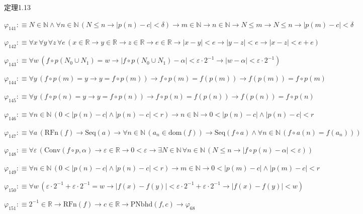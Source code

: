 \begin{fullproof}{定理1.13}
\begin{abbrevlist}
\item $\varphi_{141} :\equiv N \in \mathbb{N} \land \forall n \in \mathbb{N}\,(N \leq n \to \lvert p(n) - c \rvert < \delta) \to m \in \mathbb{N} \to n \in \mathbb{N} \to N \leq m \to N \leq n \to \lvert p(m) - c \rvert < \delta$
\item $\varphi_{142} :\equiv \forall x\,\forall y\,\forall z\,\forall e\,(x \in \mathbb{R} \to y \in \mathbb{R} \to z \in \mathbb{R} \to e \in \mathbb{R} \to \lvert x - y \rvert < e \to \lvert y - z \rvert < e \to \lvert x - z \rvert < e + e)$
\item $\varphi_{143} :\equiv \forall w\,(f \circ p(N_{0} \cup N_{1}) = w \to \lvert f \circ p(N_{0} \cup N_{1}) - \alpha \rvert < \varepsilon \cdot 2^{-1} \to \lvert w - \alpha \rvert < \varepsilon \cdot 2^{-1})$
\item $\varphi_{144} :\equiv \forall y\,(f \circ p(m) = y \to y = f \circ p(m)) \to f \circ p(m) = f(p(m)) \to f(p(m)) = f \circ p(m)$
\item $\varphi_{145} :\equiv \forall y\,(f \circ p(n) = y \to y = f \circ p(n)) \to f \circ p(n) = f(p(n)) \to f(p(n)) = f \circ p(n)$
\item $\varphi_{146} :\equiv \forall n \in \mathbb{N}\,(0 < \lvert p(n) - c \rvert \land \lvert p(n) - c \rvert < r) \to n \in \mathbb{N} \to 0 < \lvert p(n) - c \rvert \land \lvert p(n) - c \rvert < r$
\item $\varphi_{147} :\equiv \forall a\,(\mathrm{RFn}(f) \to \mathrm{Seq}(a) \to \forall n \in \mathbb{N}\,(a_{n} \in \mathrm{dom}(f)) \to \mathrm{Seq}(f \circ a) \land \forall n \in \mathbb{N}\,(f \circ a(n) = f(a_{n})))$
\item $\varphi_{148} :\equiv \forall \varepsilon\,(\mathrm{Conv}(f \circ p,\alpha) \to \varepsilon \in \mathbb{R} \to 0 < \varepsilon \to \exists N \in \mathbb{N}\,\forall n \in \mathbb{N}\,(N \leq n \to \lvert f \circ p(n) - \alpha \rvert < \varepsilon))$
\item $\varphi_{149} :\equiv \forall n \in \mathbb{N}\,(0 < \lvert p(n) - c \rvert \land \lvert p(n) - c \rvert < r) \to m \in \mathbb{N} \to 0 < \lvert p(m) - c \rvert \land \lvert p(m) - c \rvert < r$
\item $\varphi_{150} :\equiv \forall w\,(\varepsilon \cdot 2^{-1} + \varepsilon \cdot 2^{-1} = w \to \lvert f(x) - f(y) \rvert < \varepsilon \cdot 2^{-1} + \varepsilon \cdot 2^{-1} \to \lvert f(x) - f(y) \rvert < w)$
\item $\varphi_{151} :\equiv 2^{-1} \in \mathbb{R} \to \mathrm{RFn}(f) \to c \in \mathbb{R} \to \mathrm{PNbhd}(f,c) \to \varphi_{68}$

\end{abbrevlist}
\end{fullproof}
